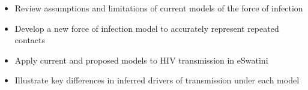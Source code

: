 \begin{itemize}
  \item Review assumptions and limitations of current models of the force of infection
  \item Develop a new force of infection model to accurately represent repeated contacts
  \item Apply current and proposed models to HIV transmission in eSwatini
  \item Illustrate key differences in inferred drivers of transmission under each model
\end{itemize}
